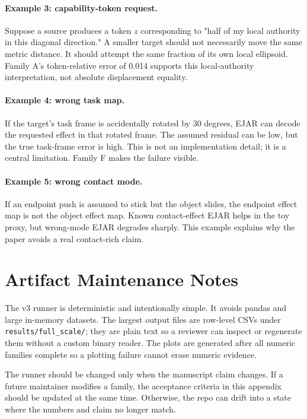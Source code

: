\documentclass{article}
\begin{document}
\paragraph{Example 3: capability-token request.}
Suppose a source produces a token $z$ corresponding to "half of my local authority in this diagonal direction." A smaller target should not necessarily move the same metric distance. It should attempt the same fraction of its own local ellipsoid. Family A's token-relative error of 0.014 supports this local-authority interpretation, not absolute displacement equality.

\paragraph{Example 4: wrong task map.}
If the target's task frame is accidentally rotated by 30 degrees, EJAR can decode the requested effect in that rotated frame. The assumed residual can be low, but the true task-frame error is high. This is not an implementation detail; it is a central limitation. Family F makes the failure visible.

\paragraph{Example 5: wrong contact mode.}
If an endpoint push is assumed to stick but the object slides, the endpoint effect map is not the object effect map. Known contact-effect EJAR helps in the toy proxy, but wrong-mode EJAR degrades sharply. This example explains why the paper avoids a real contact-rich claim.

\section{Artifact Maintenance Notes}

The v3 runner is deterministic and intentionally simple. It avoids pandas and large in-memory datasets. The largest output files are row-level CSVs under \texttt{results/full\_scale/}; they are plain text so a reviewer can inspect or regenerate them without a custom binary reader. The plots are generated after all numeric families complete so a plotting failure cannot erase numeric evidence.

The runner should be changed only when the manuscript claim changes. If a future maintainer modifies a family, the acceptance criteria in this appendix should be updated at the same time. Otherwise, the repo can drift into a state where the numbers and claim no longer match.
\end{document}
